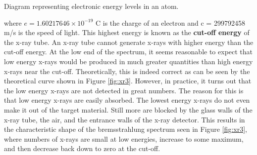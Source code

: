 \begin{marginfigure}
\caption{Diagram representing electronic energy levels in an atom.}
\label{fig:xr4}
\end{marginfigure}

\noindent where $e = 1.60217646\times10^{-19}$ C is the charge of an electron and c = 299792458 m/s is the speed of light. This highest energy is known as the {\bf cut-off energy} of the x-ray tube. An x-ray tube cannot generate x-rays with higher energy than the cut-off energy. At the low end of the spectrum, it seems reasonable to expect that low energy x-rays would be produced in much greater quantities than high energy x-rays near the cut-off. Theoretically, this is indeed correct as can be seen by the theoretical curve shown in Figure \ref{fig:xr3}. However, in practice, it turns out that the low energy x-rays are not detected in great numbers. The reason for this is that low energy x-rays are easily absorbed. The lowest energy x-rays do not even make it out of the target material. Still more are blocked by the glass walls of the x-ray tube, the air, and the entrance walls of the x-ray detector. This results in the characteristic shape of the bremsstrahlung spectrum seen in Figure \ref{fig:xr3}, where numbers of x-rays are small at low energies, increase to some maximum, and then decrease back down to zero at the cut-off.

